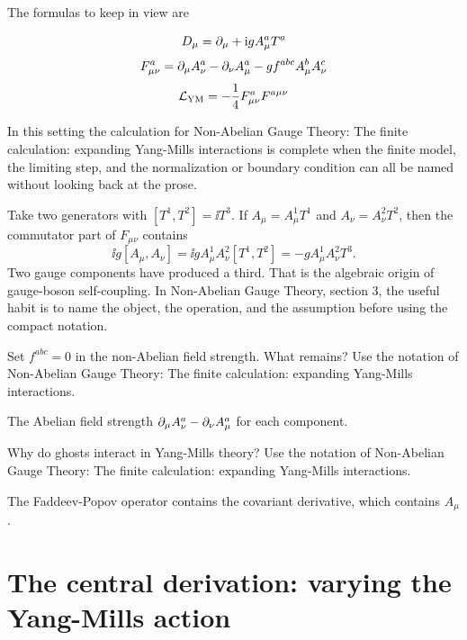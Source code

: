 The formulas to keep in view are

\[
  D_\mu=\partial_\mu+\mathrm i gA_\mu^aT^a
\]
\[
  F_{\mu\nu}^a=\partial_\mu A_\nu^a-\partial_\nu A_\mu^a-gf^{abc}A_\mu^bA_\nu^c
\]
\[
  \mathcal L_{\mathrm{YM}}=-\frac14F_{\mu\nu}^aF^{a\mu\nu}
\]

In this setting the calculation for Non-Abelian Gauge Theory: The finite calculation: expanding Yang-Mills interactions is complete when the finite model, the limiting step, and the normalization or boundary condition can all be named without looking back at the prose.




\begin{example}
Take two generators with \([T^1,T^2]=\ii T^3\).  If \(A_\mu=A_\mu^1T^1\) and \(A_\nu=A_\nu^2T^2\), then the commutator part of \(F_{\mu\nu}\) contains
\[
  \ii g[A_\mu,A_\nu]=\ii gA_\mu^1A_\nu^2[T^1,T^2]=-gA_\mu^1A_\nu^2T^3.
\]
Two gauge components have produced a third.  That is the algebraic origin of gauge-boson self-coupling.  In Non-Abelian Gauge Theory, section 3, the useful habit is to name the object, the operation, and the assumption before using the compact notation.
\end{example}



\begin{exercise}
Set \(f^{abc}=0\) in the non-Abelian field strength.  What remains?  Use the notation of Non-Abelian Gauge Theory: The finite calculation: expanding Yang-Mills interactions.
\begin{answer}
The Abelian field strength \(\partial_\mu A_\nu^a-\partial_\nu A_\mu^a\) for each component.
\end{answer}
\end{exercise}

\begin{exercise}
Why do ghosts interact in Yang-Mills theory?  Use the notation of Non-Abelian Gauge Theory: The finite calculation: expanding Yang-Mills interactions.
\begin{answer}
The Faddeev-Popov operator contains the covariant derivative, which contains \(A_\mu\).
\end{answer}
\end{exercise}



\section{The central derivation: varying the Yang-Mills action}

